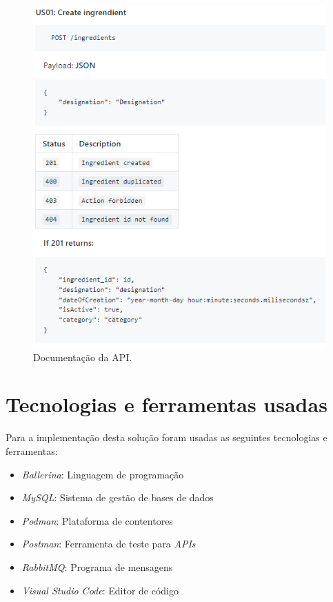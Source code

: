 \begin{figure}[H]
	\centering
	\includegraphics[scale=0.8]{figures/documentação.png}
	\caption{Documentação da API.}
	\label{fig:documentacao}
\end{figure}



\section{Tecnologias e ferramentas usadas}
Para a implementação desta solução foram usadas as seguintes tecnologias e ferramentas:

\begin{itemize}
    \item \textit{Ballerina}: Linguagem de programação
    \item \textit{MySQL}: Sistema de gestão de bases de dados
    \item \textit{Podman}: Plataforma de contentores
    \item \textit{Postman}: Ferramenta de teste para \textit{APIs}
    \item \textit{RabbitMQ}: Programa de mensagens
    \item \textit{Visual Studio Code}: Editor de código
\end{itemize}